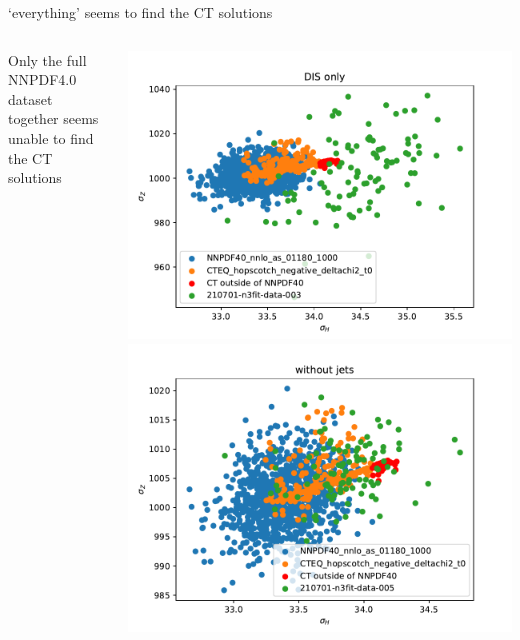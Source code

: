 \documentclass[aspectratio=169,10pt]{beamer}
\begin{document}
\begin{frame}[t]{`everything' seems to find the CT solutions}
  \vspace*{-1.5em}
  \begin{columns}
    \begin{column}{.28\textwidth}
      Only the full NNPDF4.0 dataset together seems unable to find the CT solutions
    \end{column}
    \begin{column}{.7\textwidth}
      \centering
      \includegraphics[height=.45\textheight]{DIS_only.pdf}
      \includegraphics[height=.45\textheight]{without_jets.pdf}\\

\end{column}
\end{columns}
\end{frame}
\end{document}
